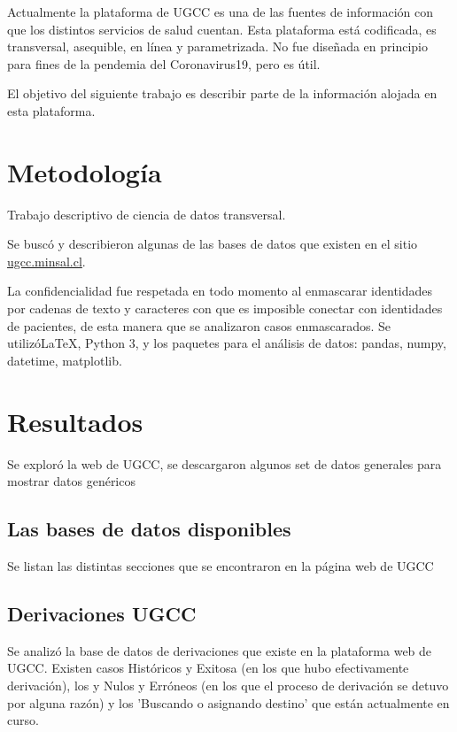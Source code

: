 \documentclass{article}
\begin{document}
Actualmente la plataforma de UGCC es una de las fuentes de información con que los distintos servicios de salud cuentan. Esta plataforma  está codificada, es transversal, asequible, en línea y parametrizada. No fue diseñada en principio para fines de la pendemia del Coronavirus19, pero es útil.

El objetivo del siguiente trabajo es describir parte de la información alojada en esta plataforma.




\section{Metodología}
Trabajo descriptivo de ciencia de datos transversal. 

Se buscó y describieron algunas de las bases de datos que existen en el sitio \href{https://ugcc.minsal.cl/}{ugcc.minsal.cl}.

La confidencialidad fue respetada en todo momento al enmascarar identidades por cadenas de texto y caracteres con que es imposible conectar con identidades de pacientes, de esta manera que se analizaron casos enmascarados.
Se utilizó\LaTeX ,  Python 3, y los paquetes para el análisis de datos: pandas, numpy, datetime, matplotlib.


\newpage


\section{Resultados}
Se exploró la web de UGCC, se descargaron algunos set de datos generales para mostrar datos genéricos


\subsection{Las bases de datos disponibles}

Se listan las distintas secciones que se encontraron en la página web de UGCC

\begin{multicols}{2}

\end{multicols}

\subsection{Derivaciones UGCC}

Se analizó la base de datos de derivaciones que existe en la plataforma web de UGCC. Existen casos Históricos y Exitosa (en los que hubo efectivamente derivación), los y Nulos y Erróneos (en los que el proceso de derivación se detuvo por alguna razón) y los 'Buscando o asignando destino' que están actualmente en curso. 
\end{document}
